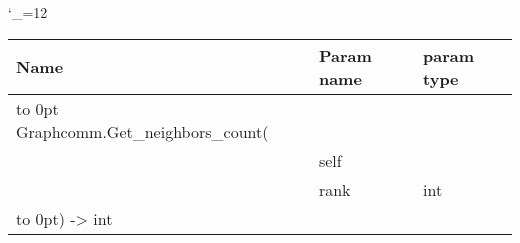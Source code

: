 \begingroup \catcode`\_=12 \tt
\begin{tabular}{lll}
\toprule
\textrm{Name}&\textrm{Param name}&\textrm{param type}\\
\midrule
\hbox to 0pt {Graphcomm.Get_neighbors_count(\hss}\\
& self\\
& rank & int\\
\hbox to 0pt{) -> int\hss}\\
\bottomrule
\end{tabular}
\endgroup
